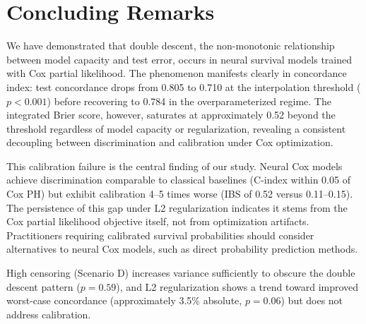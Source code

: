 \documentclass[12pt,a4paper]{article}
\begin{document}
\section{Concluding Remarks}

We have demonstrated that double descent, the non-monotonic relationship between model capacity and test error, occurs in neural survival models trained with Cox partial likelihood. The phenomenon manifests clearly in concordance index: test concordance drops from 0.805 to 0.710 at the interpolation threshold ($p < 0.001$) before recovering to 0.784 in the overparameterized regime. The integrated Brier score, however, saturates at approximately 0.52 beyond the threshold regardless of model capacity or regularization, revealing a consistent decoupling between discrimination and calibration under Cox optimization.

This calibration failure is the central finding of our study. Neural Cox models achieve discrimination comparable to classical baselines (C-index within 0.05 of Cox PH) but exhibit calibration 4--5 times worse (IBS of 0.52 versus 0.11--0.15). The persistence of this gap under L2 regularization indicates it stems from the Cox partial likelihood objective itself, not from optimization artifacts. Practitioners requiring calibrated survival probabilities should consider alternatives to neural Cox models, such as direct probability prediction methods.

High censoring (Scenario D) increases variance sufficiently to obscure the double descent pattern ($p = 0.59$), and L2 regularization shows a trend toward improved worst-case concordance (approximately 3.5\% absolute, $p = 0.06$) but does not address calibration.

\end{document}
